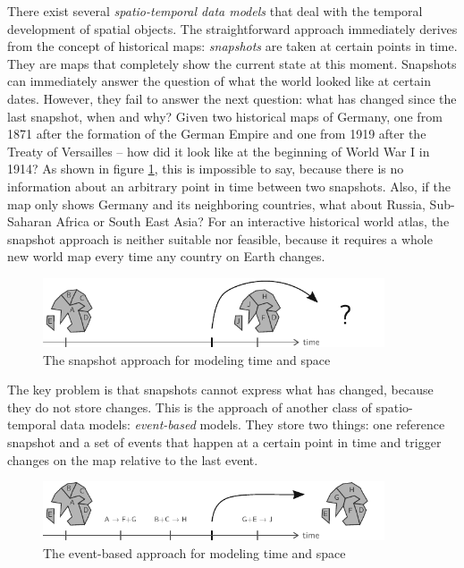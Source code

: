 There exist several \emph{spatio-temporal data models} that deal with the temporal development of spatial objects. The straightforward approach immediately derives from the concept of historical maps: \emph{snapshots} are taken at certain points in time. They are maps that completely show the current state at this moment. Snapshots can immediately answer the question of what the world looked like at certain dates. However, they fail to answer the next question: what has changed since the last snapshot, when and why? Given two historical maps of Germany, one from 1871 after the formation of the German Empire and one from 1919 after the Treaty of Versailles -- how did it look like at the beginning of World War I in 1914? As shown in figure \ref{fig:snapshot_approach}, this is impossible to say, because there is no information about an arbitrary point in time between two snapshots. Also, if the map only shows Germany and its neighboring countries, what about Russia, Sub-Saharan Africa or South East Asia? For an interactive historical world atlas, the snapshot approach is neither suitable nor feasible, because it requires a whole new world map every time any country on Earth changes.

\begin{figure}[ht]
  \vspace{1em}
  \centering
  \includegraphics[width=0.9\textwidth]{graphics/introduction/snapshot_approach}
  \caption{The snapshot approach for modeling time and space}
  \label{fig:snapshot_approach}
\end{figure}


The key problem is that snapshots cannot express what has changed, because they do not store changes. This is the approach of another class of spatio-temporal data models: \emph{event-based} models. They store two things: one reference snapshot and a set of events that happen at a certain point in time and trigger changes on the map relative to the last event.

\begin{figure}[ht]
  \vspace{1em}
  \centering
  \includegraphics[width=0.9\textwidth]{graphics/introduction/event_based_approach}
  \caption{The event-based approach for modeling time and space}
  \label{fig:event_based_approach}
\end{figure}


